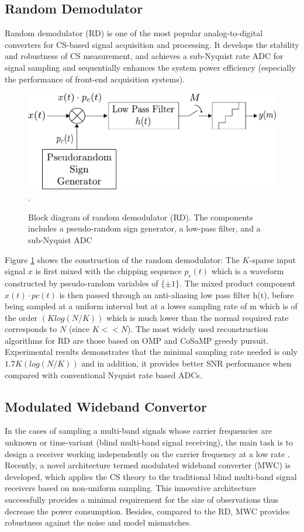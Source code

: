 \subsection{Random Demodulator}
\indent \indent Random demodulator (RD) \cite{tropp2010beyond} is one of the most popular analog-to-digital converters for CS-based signal acquisition and processing. It develops the stability and robustness of CS measurement, and achieves a sub-Nyquist rate ADC for signal sampling and sequentially enhances the system power efficiency (especially the performance of front-end acquisition systems).  

\begin{figure}
\centering
\includegraphics[width=0.5\columnwidth]{figs/random_demodulator.pdf}
\DeclareGraphicsExtensions.
\caption{Block diagram of random demodulator (RD). The components includes a pseudo-random sign generator, a low-pass filter, and a sub-Nyquist ADC}\label{RD}
\end{figure}

Figure \ref{RD} shows the construction of the random demodulator: The $K$-sparse input signal $x$ is first mixed with the chipping sequence $p_c(t)$ which is a waveform constructed by pseudo-random variables of $\{\pm 1\}$. The mixed product component $x(t) \cdot pc(t)$ is then passed through an anti-aliasing low pass filter h(t), before being sampled at a uniform interval but at a lower sampling rate of m which is of the order $(K log(N/K))$ which is much lower than the normal required rate corresponds to $N$ (since $K << N$). The most widely used reconstruction algorithms for RD are those based on OMP and CoSaMP greedy pursuit. Experimental results \cite{tropp2010beyond} demonstrates that the minimal sampling rate needed is only $1.7K(log(N/K))$ and in addition, it provides better SNR performance when compared with conventional Nyquist rate based ADCs.

\subsection{Modulated Wideband Convertor}
\indent \indent In the cases of sampling a multi-band signals whose carrier frequencies are unknown or time-variant (blind multi-band signal receiving), the main task is to design a receiver working independently on the carrier frequency at a low rate \cite{mishali2009blind}. Recently, a novel architecture termed modulated wideband converter (MWC) is developed, which applies the CS theory to the traditional blind multi-band signal receivers based on non-uniform sampling\cite{black1980time}. This innovative architecture successfully provides a minimal requirement for the size of observations \cite{mishali2010theory} thus decrease the power consumption. Besides, compared to the RD, MWC provides robustness against the noise and model mismatches.

